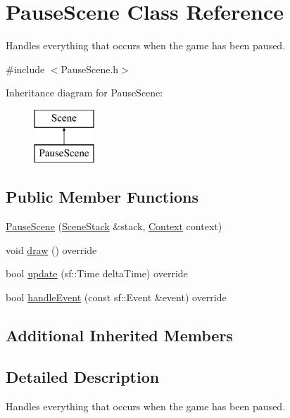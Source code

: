 \hypertarget{class_pause_scene}{}\section{Pause\+Scene Class Reference}
\label{class_pause_scene}


Handles everything that occurs when the game has been paused.  




{\ttfamily \#include $<$Pause\+Scene.\+h$>$}

Inheritance diagram for Pause\+Scene\+:\begin{figure}[H]
\begin{center}
\leavevmode
\includegraphics[height=2.000000cm]{class_pause_scene}
\end{center}
\end{figure}
\subsection*{Public Member Functions}
\begin{DoxyCompactItemize}
\item 
\hyperlink{class_pause_scene_a65ac2aa9fca0b1027481e60417749c4f}{Pause\+Scene} (\hyperlink{class_scene_stack}{Scene\+Stack} \&stack, \hyperlink{struct_scene_1_1_context}{Context} context)
\item 
void \hyperlink{class_pause_scene_abfd1398a064a83b3ae6ac5fd98aebf05}{draw} () override
\item 
bool \hyperlink{class_pause_scene_a8504260009b4dfb2380785e938e60b4b}{update} (sf\+::\+Time delta\+Time) override
\item 
bool \hyperlink{class_pause_scene_adeb06e37e0a2afa297ddbe795c3cbe94}{handle\+Event} (const sf\+::\+Event \&event) override
\end{DoxyCompactItemize}
\subsection*{Additional Inherited Members}


\subsection{Detailed Description}
Handles everything that occurs when the game has been paused. 



